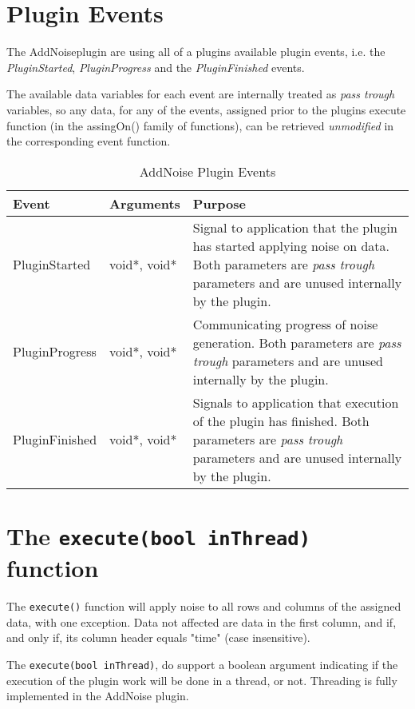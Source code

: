 \section{Plugin Events}
The AddNoiseplugin are using all of a plugins available plugin events, i.e. the \emph{PluginStarted}, \emph{PluginProgress} and the \emph{PluginFinished} events.

The available data variables for each event are internally treated as \emph{pass trough} variables, so any data, for any of the events, assigned prior to
the plugins execute function (in the assingOn() family of functions), can be retrieved \emph{unmodified} in the corresponding event function.
\begin{table}[ht]
\centering %
\begin{tabular}{l l p{7.5cm}} %

Event & Arguments & Purpose \\ [0.5ex] %
\hline %
\hline %
PluginStarted  	& 	void*, void*  & Signal to application that the plugin has started applying noise on data. Both parameters are \emph{pass trough} parameters and are unused internally by the plugin.\\[0.5ex]
PluginProgress	& 	void*, void*  & Communicating progress of noise generation. Both parameters are \emph{pass trough} parameters and are unused internally by the plugin. \\[0.5ex]
PluginFinished	& 	void*, void*  & Signals to application that execution of the plugin has finished. Both parameters are \emph{pass trough} parameters and are unused internally by the plugin.\\

\hline %
\end{tabular}
\caption{AddNoise Plugin Events}
\label{table:AddNoisePluginEvents}
\end{table}

\section{The \texttt{execute(bool inThread)} function}
The \verb|execute()| function will apply noise to all rows and columns of the assigned data, with one exception. Data not affected are data in the first column, and if, and only if, its column header equals "time" (case insensitive).

The \verb|execute(bool inThread)|, do support a boolean argument indicating if the execution of the plugin work will be done in a thread, or not. Threading is fully implemented in the AddNoise plugin.

